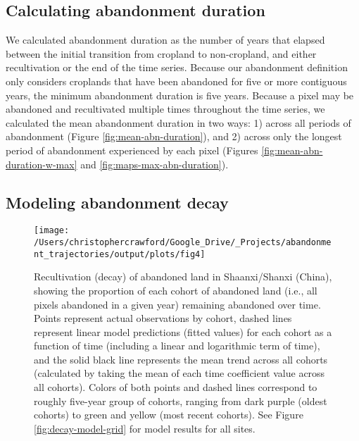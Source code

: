 \documentclass[9pt,twocolumn,twoside,lineno]{pnas-new}
\begin{document}
\hypertarget{calculating-abandonment-duration}{%
\subsection*{Calculating abandonment duration}\label{calculating-abandonment-duration}}

We calculated abandonment duration as the number of years that elapsed between the initial transition from cropland to non-cropland, and either recultivation or the end of the time series.
Because our abandonment definition only considers croplands that have been abandoned for five or more contiguous years, the minimum abandonment duration is five years.
Because a pixel may be abandoned and recultivated multiple times throughout the time series, we calculated the mean abandonment duration in two ways: 1) across all periods of abandonment (Figure \ref{fig:mean-abn-duration}), and 2) across only the longest period of abandonment experienced by each pixel (Figures \ref{fig:mean-abn-duration-w-max} and \ref{fig:maps-max-abn-duration}).

\hypertarget{modeling-abandonment-decay}{%
\subsection*{Modeling abandonment decay}\label{modeling-abandonment-decay}}



\begin{figure}
\texttt{[image: /Users/christophercrawford/Google\_Drive/\_Projects/abandonment\_trajectories/output/plots/fig4]} \caption{Recultivation (decay) of abandoned land in Shaanxi/Shanxi (China), showing the proportion of each cohort of abandoned land (i.e., all pixels abandoned in a given year) remaining abandoned over time. Points represent actual observations by cohort, dashed lines represent linear model predictions (fitted values) for each cohort as a function of time (including a linear and logarithmic term of time), and the solid black line represents the mean trend across all cohorts (calculated by taking the mean of each time coefficient value across all cohorts). Colors of both points and dashed lines correspond to roughly five-year group of cohorts, ranging from dark purple (oldest cohorts) to green and yellow (most recent cohorts). See Figure \ref{fig:decay-model-grid} for model results for all sites.}\label{fig:abn-decay-s}
\end{figure}
\end{document}
